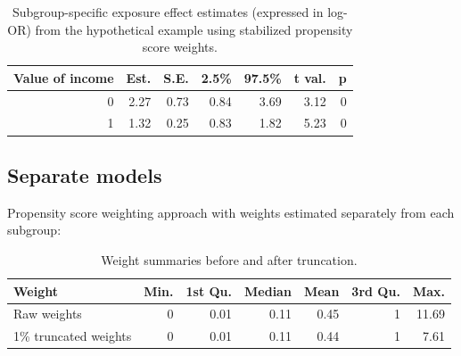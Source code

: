 \documentclass[
  letterpaper,
  DIV=11,
  numbers=noendperiod]{scrreprt}
\newenvironment{Shaded}{\begin{snugshade}}{\end{snugshade}}
\newcommand{\AttributeTok}[1]{\textcolor[rgb]{0.40,0.45,0.13}{#1}}
\newcommand{\ConstantTok}[1]{\textcolor[rgb]{0.56,0.35,0.01}{#1}}
\newcommand{\DecValTok}[1]{\textcolor[rgb]{0.68,0.00,0.00}{#1}}
\newcommand{\FloatTok}[1]{\textcolor[rgb]{0.68,0.00,0.00}{#1}}
\newcommand{\FunctionTok}[1]{\textcolor[rgb]{0.28,0.35,0.67}{#1}}
\newcommand{\NormalTok}[1]{\textcolor[rgb]{0.00,0.23,0.31}{#1}}
\newcommand{\OtherTok}[1]{\textcolor[rgb]{0.00,0.23,0.31}{#1}}
\newcommand{\SpecialCharTok}[1]{\textcolor[rgb]{0.37,0.37,0.37}{#1}}
\newcommand{\StringTok}[1]{\textcolor[rgb]{0.13,0.47,0.30}{#1}}
\begin{document}
\hypertarget{tbl-weight-model}{}
\begin{table}[!h]
\caption{\label{tbl-weight-model}Subgroup-specific exposure effect estimates (expressed in log-OR) from
the hypothetical example using stabilized propensity score weights. }\tabularnewline

\centering
\begin{tabular}{rrrrrrr}
\toprule
Value of income & Est. & S.E. & 2.5\% & 97.5\% & t val. & p\\
\midrule
0 & 2.27 & 0.73 & 0.84 & 3.69 & 3.12 & 0\\
1 & 1.32 & 0.25 & 0.83 & 1.82 & 5.23 & 0\\
\bottomrule
\end{tabular}
\end{table}

\hypertarget{separate-models}{%
\subsection{Separate models}\label{separate-models}}

Propensity score weighting approach with weights estimated separately
from each subgroup:

\begin{Shaded}
\end{Shaded}

\hypertarget{tbl-weight-model2}{}
\begin{table}[!h]
\caption{\label{tbl-weight-model2}Weight summaries before and after truncation. }\tabularnewline

\centering
\begin{tabular}{lrrrrrr}
\toprule
Weight & Min. & 1st Qu. & Median & Mean & 3rd Qu. & Max.\\
\midrule
Raw weights & 0 & 0.01 & 0.11 & 0.45 & 1 & 11.69\\
1\% truncated weights & 0 & 0.01 & 0.11 & 0.44 & 1 & 7.61\\
\bottomrule
\end{tabular}
\end{table}
\end{document}
